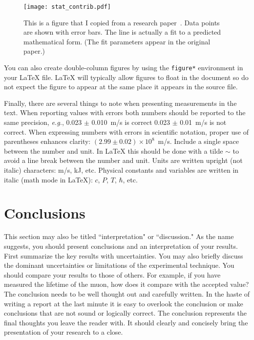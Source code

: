 \documentclass[aps,prd,reprint]{revtex4-1}
\begin{document}

\begin{figure}
\begin{center}
\texttt{[image: stat\_contrib.pdf]}
\caption{\label{fig:sample}This is a figure that I copied from a research paper~\cite{Bennett:2010nf}.  Data points are shown with error bars.  The line is actually a fit to a predicted mathematical form.  (The fit parameters appear in the original paper.)}
\end{center}
\end{figure}

You can also create double-column figures by using the {\tt figure*} environment in your \LaTeX{} file.  \LaTeX{} will typically allow figures to float in the document so do not expect the figure to appear at the same place it appears in the source file.

Finally, there are several things to note when presenting measurements in the text.  When reporting values with errors both numbers should be reported to the same precision, {\it e.g.}, 0.023 $\pm$ 0.010~m/s is correct 0.023 $\pm$ 0.01~m/s is not correct.  When expressing numbers with errors in scientific notation, proper use of parentheses enhances clarity:  $(2.99\pm0.02)\times 10^8$~m/s.  Include a single space between the number and unit.  In \LaTeX{} this should be done with a tilde $\sim$ to avoid a line break between the number and unit.  Units are written upright (not italic) characters:  m/s, kJ, etc.  Physical constants and variables are written in italic (math mode in \LaTeX{}):  $c$, $P$, $T$, $\hbar$, etc.

\section{Conclusions}

This section may also be titled ``interpretation" or ``discussion."  As the name suggests, you should present conclusions and an interpretation of your results.  First summarize the key results with uncertainties.  You may also briefly discuss the dominant uncertainties or limitations of the experimental technique.  You should compare your results to those of others.  For example, if you have measured the lifetime of the muon, how does it compare with the accepted value?  The conclusion needs to be well thought out and carefully written.  In the haste of writing a report at the last minute it is easy to overlook the conclusion or make conclusions that are not sound or logically correct.  The conclusion represents the final thoughts you leave the reader with.  It should clearly and concisely bring the presentation of your research to a close.
\end{document}

